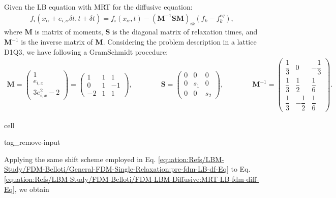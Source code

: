 \documentclass[letterpaper,10pt,english,openany,oneside]{jupyterBook}
\begin{document}
\sphinxAtStartPar
Given the LB equation with MRT for the diffusive equation:
\begin{equation}\label{equation:Refs/LBM-Study/FDM-Belloti/FDM-LBM-Diffusive:MRT-LB-fdm-diff-Eq}
\begin{split}
f_i( x_{\alpha} + e_{i,\alpha} \delta t, t+\delta t) = f_i(x_{\alpha}, t)  - (\textbf{M}^{-1}\textbf{S}\textbf{M})_{ik}\left( f_{k} - f_{k}^{eq}  \right), 
\end{split}
\end{equation}
\sphinxAtStartPar
where \(\textbf{M}\) is matrix of moments, \(\textbf{S}\) is the diagonal matrix of relaxation times, and \(\textbf{M}^{-1}\) is the inverse matrix of \(\textbf{M}\). Considering the problem description in a lattice D1Q3, we have following a Gram\sphinxhyphen{}Schmidt procedure:
\begin{equation*}
\begin{split}
\textbf{M} =\begin{pmatrix} 1 \\ e_{i,x} \\ 3e_{i,x}^{2}-2 \end{pmatrix} =\begin{pmatrix} 1 & 1 & 1 \\ 0 & 1   & -1 \\ -2  & 1 & 1 \end{pmatrix},  \qquad \qquad  \textbf{S} = \begin{pmatrix} 0 & 0   & 0 \\ 0   & s_1 & 0 \\ 0   & 0   & s_2 \end{pmatrix},  \qquad \qquad \textbf{M}^{-1}=\begin{pmatrix}\dfrac{1}{3} & 0 & -\dfrac{1}{3} \\ \dfrac{1}{3} & \dfrac{1}{2} & \dfrac{1}{6} \\ \dfrac{1}{3} & -\dfrac{1}{2} & \dfrac{1}{6} \end{pmatrix}.
\end{split}
\end{equation*}
\begin{sphinxuseclass}{cell}
\begin{sphinxuseclass}{tag_remove-input}
\end{sphinxuseclass}
\end{sphinxuseclass}
\sphinxAtStartPar
Applying the same shift scheme employed in Eq. \eqref{equation:Refs/LBM-Study/FDM-Belloti/General-FDM-Single-Relaxation:pre-fdm-LB-df-Eq} to Eq. \eqref{equation:Refs/LBM-Study/FDM-Belloti/FDM-LBM-Diffusive:MRT-LB-fdm-diff-Eq}, we obtain
\end{document}
